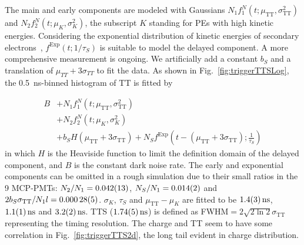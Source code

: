 The main and early components are modeled with Gaussians $N_1f_1^N(t;\mu_{\mathrm{TT}},\sigma_{\mathrm{TT}}^2)$ and $N_2f_2^N(t;\mu_K,\sigma_K^2)$, the subscript $K$ standing for PEs with high kinetic energies. Considering the exponential distribution of kinetic energies of secondary electrons~\cite{Furman,SecondElectron}, $f^\mathrm{Exp}(t;1/\tau_S)$ is suitable to model the delayed component.  A more comprehensive measurement is ongoing.  We artificially add a constant $b_S$ and a translation of $\mu_{TT} + 3\sigma_{TT}$ to fit the data. As shown in Fig.~\ref{fig:triggerTTSLog}, the \SI{0.5}{ns}-binned histogram of $\mathrm{TT}$ is fitted by

\begin{equation}
    \begin{aligned}
        B&+N_1f_1^N(t;\mu_{\mathrm{TT}},\sigma_{\mathrm{TT}}^2)\\
        &+N_2f_2^N(t;\mu_K,\sigma_K^2)\\
        &+b_SH(\mu_{\mathrm{TT}}+3\sigma_{\mathrm{TT}})+N_Sf^{\mathrm{Exp}}\left(t-(\mu_{\mathrm{TT}}+3\sigma_{\mathrm{TT}});\frac{1}{\tau_S}\right)
    \end{aligned}
\end{equation}
in which $H$ is the Heaviside function to limit the definition domain of the delayed component, and $B$ is the constant dark noise rate. The early and exponential components can be omitted in a rough simulation due to their small ratios in the 9 MCP-PMTs: $N_2/N_1 = \num{0.042\pm0.013}$, $N_S/N_1 = \num{0.014\pm0.002}$ and $2b_S\sigma_{\mathrm{TT}}/N_1 l= \num{0.00028\pm0.00005}$.  $\sigma_K$, $\tau_S$ and $\mu_{\mathrm{TT}}-\mu_K$ are fitted to be $\SI{1.4 \pm 0.3}{ns}$, $\SI{1.1\pm 0.1}{ns}$ and $\SI{3.2\pm 0.2}{ns}$. TTS ($\SI{1.74\pm0.05}{ns}$) is defined as FWHM$=2\sqrt{2\ln 2}\sigma_{\mathrm{TT}}$~\cite{HAMAMATSUManual} representing the timing resolution. The charge and TT seem to have some correlation in Fig.~\ref{fig:triggerTTS2d}, the long tail evident in charge distribution.

